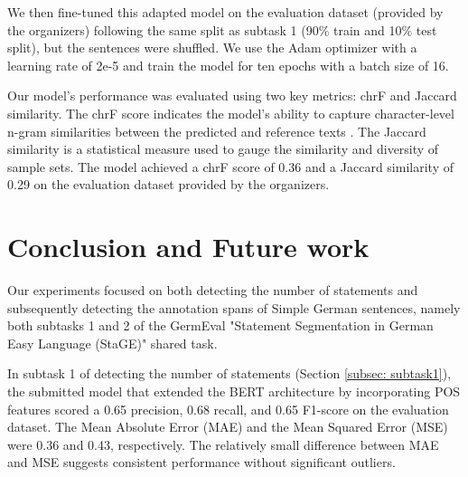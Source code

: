 \documentclass[11pt]{article}
\begin{document}
We then fine-tuned this adapted model on the evaluation dataset (provided by the organizers) following the same split as subtask 1 (90\% train and 10\% test split), but the sentences were shuffled. We use the Adam optimizer \citep{kingma2014adam} with a learning rate of 2e-5 and train the model for ten epochs with a batch size of 16.

Our model's performance was evaluated using two key metrics: chrF and Jaccard similarity. The chrF score indicates the model's ability to capture character-level n-gram similarities between the predicted and reference texts \citep{popovic2015chrf}. The Jaccard similarity is a statistical measure used to gauge the similarity and diversity of sample sets. The model achieved a chrF score of 0.36 and a Jaccard similarity of 0.29 on the evaluation dataset provided by the organizers.




\section{Conclusion and Future work}

Our experiments focused on both detecting the number of statements and subsequently detecting the annotation spans of Simple German sentences, namely both subtasks 1 and 2 of the GermEval "Statement Segmentation in German Easy Language (StaGE)" shared task. 

In subtask 1 of detecting the number of statements (Section \ref{subsec: subtask1}), the submitted model that extended the BERT architecture by incorporating POS features scored a 0.65 precision, 0.68 recall, and 0.65 F1-score on the evaluation dataset. The  Mean Absolute Error (MAE) and the Mean Squared Error (MSE) were 0.36 and 0.43, respectively. The relatively small difference between MAE and MSE suggests consistent performance without significant outliers. 
\end{document}
